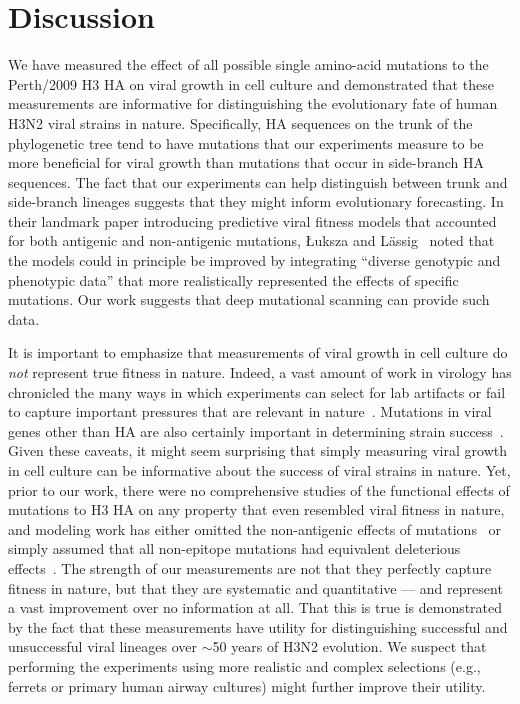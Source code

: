 \documentclass[9pt,twocolumn,twoside]{pnas-new}
\begin{document}
\section*{Discussion}
\label{sec:discussion}
We have measured the effect of all possible single amino-acid mutations to the Perth/2009 H3 HA on viral growth in cell culture and demonstrated that these measurements are informative for distinguishing the evolutionary fate of human H3N2 viral strains in nature.
Specifically, HA sequences on the trunk of the phylogenetic tree tend to have mutations that our experiments measure to be more beneficial for viral growth than mutations that occur in side-branch HA sequences.
The fact that our experiments can help distinguish between trunk and side-branch lineages suggests that they might inform evolutionary forecasting.
In their landmark paper introducing predictive viral fitness models that accounted for both antigenic and non-antigenic mutations, {\L}uksza and L{\"a}ssig~\cite{luksza2014predictive} noted that the models could in principle be improved by integrating ``diverse genotypic and phenotypic data'' that more realistically represented the effects of specific mutations.
Our work suggests that deep mutational scanning can provide such data.

It is important to emphasize that measurements of viral growth in cell culture do \emph{not} represent true fitness in nature.
Indeed, a vast amount of work in virology has chronicled the many ways in which experiments can select for lab artifacts or fail to capture important pressures that are relevant in nature~\cite{daniels1985fusion,sun2010modifications,lee2013comparison,wu2017structural}.
Mutations in viral genes other than HA are also certainly important in determining strain success~\cite{memoli2009recent,raghwani2017selection}.
Given these caveats, it might seem surprising that simply measuring viral growth in cell culture can be informative about the success of viral strains in nature.
Yet, prior to our work, there were no comprehensive studies of the functional effects of mutations to H3 HA on any property that even resembled viral fitness in nature, and modeling work has either omitted the non-antigenic effects of mutations~\cite{sun2013using,harvey2016identification,neher2016prediction} or simply assumed that all non-epitope mutations had equivalent deleterious effects~\cite{luksza2014predictive}.
The strength of our measurements are not that they perfectly capture fitness in nature, but that they are systematic and quantitative --- and represent a vast improvement over no information at all.
That this is true is demonstrated by the fact that these measurements have utility for distinguishing successful and unsuccessful viral lineages over $\sim$50 years of H3N2 evolution.
We suspect that performing the experiments using more realistic and complex selections (e.g., ferrets or primary human airway cultures) might further improve their utility.
\end{document}
